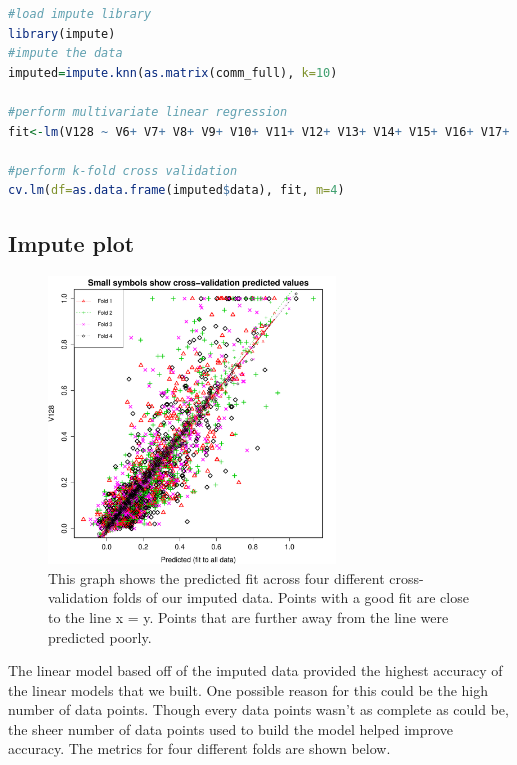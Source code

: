 \documentclass{article}
\begin{document}
\begin{lstlisting}[language=r]
#load impute library
library(impute)
#impute the data
imputed=impute.knn(as.matrix(comm_full), k=10)

#perform multivariate linear regression
fit<-lm(V128 ~ V6+ V7+ V8+ V9+ V10+ V11+ V12+ V13+ V14+ V15+ V16+ V17+ V18+ V19+ V20+ V21+ V22+ V23+ V24+ V25+ V26+ V27+ V28+ V29+ V30+ V32+ V33+ V34+ V35+ V36+ V37+ V38+ V39+ V40+ V41+ V42+ V43+ V44+ V45+ V46+ V47+ V48+ V49+ V50+ V51+ V52+ V53+ V54+ V55+ V56+ V57+ V58+ V59+ V60+ V61+ V62+ V63+ V64+ V65+ V66+ V67+ V68+ V69+ V70+ V71+ V72+ V73+ V74+ V75+ V76+ V77+ V78+ V79+ V80+ V81+ V82+ V83+ V84+ V85+ V86+ V87+ V88+ V89+ V90+ V91+ V92+ V93+ V94+ V95+ V96+ V97+ V98+ V99+ V100+ V101+ V119+ V120+ V121+ V126, data=as.data.frame(imputed$data))

#perform k-fold cross validation
cv.lm(df=as.data.frame(imputed$data), fit, m=4)
\end{lstlisting}

\subsection{Impute plot}
\begin{figure}[H]
\centering
\includegraphics[width=3.0in]{impute.pdf}
\caption{This graph shows the predicted fit across four different cross-validation folds of our imputed data. Points with a good fit are close to the line x = y. Points that are further away from the line were predicted poorly.}\label{fig_container} 
\end{figure}

The linear model based off of the imputed data provided the highest accuracy of the linear models that we built. One possible reason for this could be the high number of data points. Though every data points wasn't as complete as could be, the sheer number of data points used to build the model helped improve accuracy. The metrics for four different folds are shown below.\\ 
\end{document}
